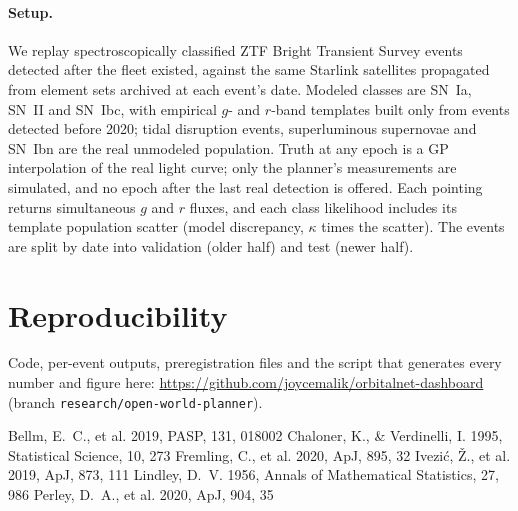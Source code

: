 \documentclass[10pt,twocolumn]{article}
\begin{document}
\paragraph{Setup.} We replay spectroscopically classified ZTF Bright Transient Survey events \citep{Fremling2020,Perley2020} detected after the fleet existed, against the same Starlink satellites propagated from element sets archived at each event's date. Modeled classes are SN~Ia, SN~II and SN~Ibc, with empirical $g$- and $r$-band templates built only from events detected before 2020; tidal disruption events, superluminous supernovae and SN~Ibn are the real unmodeled population. Truth at any epoch is a GP interpolation of the real light curve; only the planner's measurements are simulated, and no epoch after the last real detection is offered. Each pointing returns simultaneous $g$ and $r$ fluxes, and each class likelihood includes its template population scatter (model discrepancy, $\kappa$ times the scatter). The events are split by date into validation (older half) and test (newer half).





\section*{Reproducibility}
Code, per-event outputs, preregistration files and the script that generates every number and figure here: \url{https://github.com/joycemalik/orbitalnet-dashboard} (branch \texttt{research/open-world-planner}). %

\begin{thebibliography}{}
 Bellm, E.~C., et al. 2019, PASP, 131, 018002
 Chaloner, K., \& Verdinelli, I. 1995, Statistical Science, 10, 273
 Fremling, C., et al. 2020, ApJ, 895, 32
 Ivezi\'c, \v{Z}., et al. 2019, ApJ, 873, 111
 Lindley, D.~V. 1956, Annals of Mathematical Statistics, 27, 986
 Perley, D.~A., et al. 2020, ApJ, 904, 35
\end{thebibliography}
\end{document}
